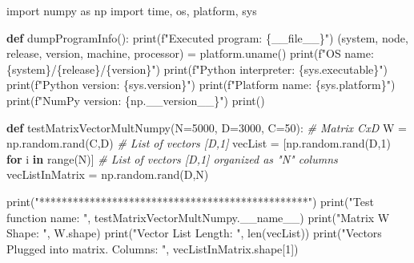 \documentclass[
]{article}
\newenvironment{Shaded}{}{}
\newcommand{\BuiltInTok}[1]{#1}
\newcommand{\CommentTok}[1]{\textcolor[rgb]{0.38,0.63,0.69}{\textit{#1}}}
\newcommand{\ControlFlowTok}[1]{\textcolor[rgb]{0.00,0.44,0.13}{\textbf{#1}}}
\newcommand{\DecValTok}[1]{\textcolor[rgb]{0.25,0.63,0.44}{#1}}
\newcommand{\ImportTok}[1]{#1}
\newcommand{\KeywordTok}[1]{\textcolor[rgb]{0.00,0.44,0.13}{\textbf{#1}}}
\newcommand{\NormalTok}[1]{#1}
\newcommand{\OperatorTok}[1]{\textcolor[rgb]{0.40,0.40,0.40}{#1}}
\newcommand{\SpecialCharTok}[1]{\textcolor[rgb]{0.25,0.44,0.63}{#1}}
\newcommand{\SpecialStringTok}[1]{\textcolor[rgb]{0.73,0.40,0.53}{#1}}
\newcommand{\StringTok}[1]{\textcolor[rgb]{0.25,0.44,0.63}{#1}}
\newcommand{\VariableTok}[1]{\textcolor[rgb]{0.10,0.09,0.49}{#1}}
\begin{document}
\begin{Shaded}
\begin{Highlighting}[]

\ImportTok{import}\NormalTok{ numpy }\ImportTok{as}\NormalTok{ np}
\ImportTok{import}\NormalTok{ time, os, platform, sys}

\KeywordTok{def}\NormalTok{ dumpProgramInfo():}
    \BuiltInTok{print}\NormalTok{(}\SpecialStringTok{f"Executed program: }\SpecialCharTok{\{}\VariableTok{\_\_file\_\_}\SpecialCharTok{\}}\SpecialStringTok{"}\NormalTok{)}
\NormalTok{    (system, node, release, version, machine, processor) }\OperatorTok{=}\NormalTok{ platform.uname()}
    \BuiltInTok{print}\NormalTok{(}\SpecialStringTok{f"OS name: }\SpecialCharTok{\{}\NormalTok{system}\SpecialCharTok{\}}\SpecialStringTok{/}\SpecialCharTok{\{}\NormalTok{release}\SpecialCharTok{\}}\SpecialStringTok{/}\SpecialCharTok{\{}\NormalTok{version}\SpecialCharTok{\}}\SpecialStringTok{"}\NormalTok{)}
    \BuiltInTok{print}\NormalTok{(}\SpecialStringTok{f"Python interpreter: }\SpecialCharTok{\{}\NormalTok{sys}\SpecialCharTok{.}\NormalTok{executable}\SpecialCharTok{\}}\SpecialStringTok{"}\NormalTok{)}
    \BuiltInTok{print}\NormalTok{(}\SpecialStringTok{f"Python version: }\SpecialCharTok{\{}\NormalTok{sys}\SpecialCharTok{.}\NormalTok{version}\SpecialCharTok{\}}\SpecialStringTok{"}\NormalTok{)}
    \BuiltInTok{print}\NormalTok{(}\SpecialStringTok{f"Platform name: }\SpecialCharTok{\{}\NormalTok{sys}\SpecialCharTok{.}\NormalTok{platform}\SpecialCharTok{\}}\SpecialStringTok{"}\NormalTok{)}
    \BuiltInTok{print}\NormalTok{(}\SpecialStringTok{f"NumPy version: }\SpecialCharTok{\{}\NormalTok{np}\SpecialCharTok{.}\NormalTok{\_\_version\_\_}\SpecialCharTok{\}}\SpecialStringTok{"}\NormalTok{)}
    \BuiltInTok{print}\NormalTok{()}

\KeywordTok{def}\NormalTok{ testMatrixVectorMultNumpy(N}\OperatorTok{=}\DecValTok{5000}\NormalTok{, D}\OperatorTok{=}\DecValTok{3000}\NormalTok{, C}\OperatorTok{=}\DecValTok{50}\NormalTok{):}
    \CommentTok{\# Matrix CxD}
\NormalTok{    W }\OperatorTok{=}\NormalTok{ np.random.rand(C,D)                            }
    \CommentTok{\# List of vectors [D,1]}
\NormalTok{    vecList }\OperatorTok{=}\NormalTok{ [np.random.rand(D,}\DecValTok{1}\NormalTok{) }\ControlFlowTok{for}\NormalTok{ i }\KeywordTok{in} \BuiltInTok{range}\NormalTok{(N)]  }
     \CommentTok{\# List of vectors [D,1] organized as "N" columns}
\NormalTok{    vecListInMatrix }\OperatorTok{=}\NormalTok{ np.random.rand(D,N)}

    \BuiltInTok{print}\NormalTok{(}\StringTok{"************************************************"}\NormalTok{)}
    \BuiltInTok{print}\NormalTok{(}\StringTok{"Test function name: "}\NormalTok{, testMatrixVectorMultNumpy.}\VariableTok{\_\_name\_\_}\NormalTok{)}
    \BuiltInTok{print}\NormalTok{(}\StringTok{"Matrix W Shape: "}\NormalTok{, W.shape)}
    \BuiltInTok{print}\NormalTok{(}\StringTok{"Vector List Length: "}\NormalTok{, }\BuiltInTok{len}\NormalTok{(vecList))}
    \BuiltInTok{print}\NormalTok{(}\StringTok{"Vectors Plugged into matrix. Columns: "}\NormalTok{, vecListInMatrix.shape[}\DecValTok{1}\NormalTok{])}


\end{Highlighting}
\end{Shaded}
\end{document}
